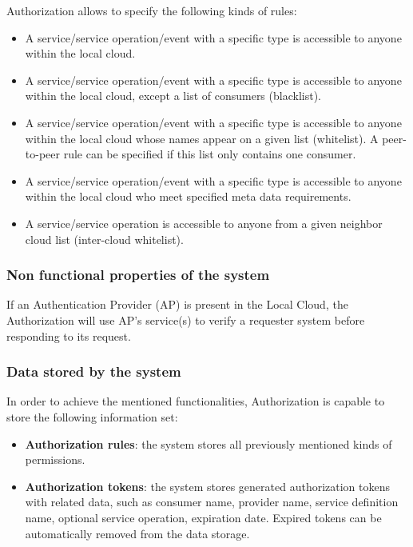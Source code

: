 \documentclass[a4paper]{arrowhead}
\begin{document}
Authorization allows to specify the following kinds of rules:

\begin{itemize}
    \item A service/service operation/event with a specific type  is accessible to anyone within the local cloud.
    \item A service/service operation/event with a specific type is accessible to anyone within the local cloud, except a list of consumers (blacklist).
    \item A service/service operation/event with a specific type is accessible to anyone within the local cloud whose names appear on a given list (whitelist). A peer-to-peer rule can be specified if this list only contains one consumer.
    \item A service/service operation/event with a specific type is accessible to anyone within the local cloud who meet specified meta data requirements.
    \item A service/service operation is accessible to anyone from a given neighbor cloud list (inter-cloud whitelist).
\end{itemize}

\subsubsection {Non functional properties of the system}
If an Authentication Provider (AP) is present in the Local Cloud, the Authorization will use AP's service(s) to verify a requester system before responding to its request. 

\subsubsection {Data stored by the system}
In order to achieve the mentioned functionalities, Authorization is capable to store the following information set:

\begin{itemize}
    \item \textbf{Authorization rules}: the system stores all previously mentioned kinds of permissions.
    \item \textbf{Authorization tokens}: the system stores generated authorization tokens with related data, such as consumer name, provider name, service definition name, optional service operation, expiration date. Expired tokens can be automatically removed from the data storage.
\end{itemize}
\end{document}
